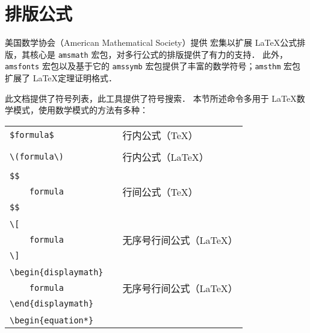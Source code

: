 \section{排版公式}

美国数学协会（American Mathematical Society）提供  \AmS 宏集以扩展 \LaTeX 公式排版，其核心是 \verb|amsmath|\cite{amsmath} 宏包，对多行公式的排版提供了有力的支持．
此外，\verb|amsfonts|\cite{amsfonts} 宏包以及基于它的 \verb|amssymb| 宏包提供了丰富的数学符号；\verb|amsthm|\cite{amsthm} 宏包扩展了 \LaTeX 定理证明格式．

此文档\cite{symbols}提供了符号列表，此工具\cite{Detexify}提供了符号搜索．
本节所述命令多用于 \LaTeX 数学模式，使用数学模式的方法有多种：

\begin{table}[h!]
	\centering
	\begin{tabular}{l p{6em} l}
		\verb|$|{\color{gray}\verb|formula|}\verb|$|   && 行内公式（\TeX） \\
		                                               && \\
		\verb|\(|{\color{gray}\verb|formula|}\verb|\)| && 行内公式（\LaTeX） \\
		                                               && \\
		\verb|$$|                                      && \\
		\verb|    |{\color{gray}\verb|formula|}        && 行间公式（\TeX） \\
		\verb|$$|                                      && \\
		                                               && \\
		\verb|\[|                                      && \\
		\verb|    |{\color{gray}\verb|formula|}        && 无序号行间公式（\LaTeX） \\
		\verb|\]|                                      && \\
		                                               && \\
		\verb|\begin{displaymath}|                     && \\
		\verb|    |{\color{gray}\verb|formula|}        && 无序号行间公式（\LaTeX） \\
		\verb|\end{displaymath}|                       && \\
		                                               && \\
		\verb|\begin{equation*}|                       && \\

\end{tabular}
\end{table}
